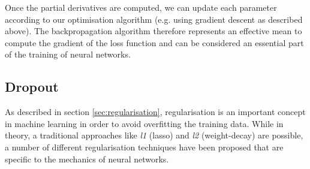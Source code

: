 Once the partial derivatives are computed, we can update each parameter according to our optimisation algorithm (e.g. using gradient descent as described above). 
The backpropagation algorithm therefore represents an effective mean to compute the gradient of the loss function and can be considered an essential part of the training of neural networks. 



%
%

\subsection{Dropout} \label{sec:dropout}
As described in section \ref{sec:regularisation}, regularisation is an important concept in machine learning in order to avoid overfitting the training data. While in theory, a traditional approaches like \emph{l1} (lasso) and \emph{l2} (weight-decay) are possible, a number of different regularisation techniques have been proposed that are specific to the mechanics of neural networks. 

